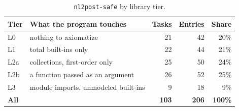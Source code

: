 
\begin{table}[t]\centering\small
\caption{\texttt{nl2post-safe} by library tier.}
\label{tab:dataset}
\begin{tabular}{llrrr}
\toprule
Tier & What the program touches & Tasks & Entries & Share \\
\midrule
L0 & nothing to axiomatize & 21 & 42 & 20\% \\
L1 & total built-ins only & 22 & 44 & 21\% \\
L2a & collections, first-order only & 25 & 50 & 24\% \\
L2b & a function passed as an argument & 26 & 52 & 25\% \\
L3 & module imports, unmodeled built-ins & 9 & 18 & 9\% \\
\midrule
\textbf{All} & & \textbf{103} & \textbf{206} & \textbf{100\%} \\
\bottomrule
\end{tabular}
\end{table}
